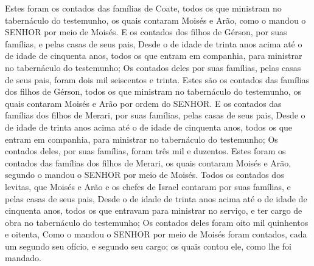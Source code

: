 {  Estes foram os contados das famílias de Coate, todos os que ministram no tabernáculo do testemunho, os quais contaram Moisés e Arão, como o mandou o SENHOR por meio de Moisés.
  E os contados dos filhos de Gérson, por suas famílias, e pelas casas de seus pais,
  Desde o de idade de trinta anos acima até o de idade de cinquenta anos, todos os que entram em companhia, para ministrar no tabernáculo do testemunho;
  Os contados deles por suas famílias, pelas casas de seus pais, foram dois mil seiscentos e trinta.
  Estes são os contados das famílias dos filhos de Gérson, todos os que ministram no tabernáculo do testemunho, os quais contaram Moisés e Arão por ordem do SENHOR.
  E os contados das famílias dos filhos de Merari, por suas famílias, pelas casas de seus pais,
  Desde o de idade de trinta anos acima até o de idade de cinquenta anos, todos os que entram em companhia, para ministrar no tabernáculo do testemunho;
  Os contados deles, por suas famílias, foram três mil e duzentos.
  Estes foram os contados das famílias dos filhos de Merari, os quais contaram Moisés e Arão, segundo o mandou o SENHOR por meio de Moisés.
  Todos os contados dos levitas, que Moisés e Arão e os chefes de Israel contaram por suas famílias, e pelas casas de seus pais,
  Desde o de idade de trinta anos acima até o de idade de cinquenta anos, todos os que entravam para ministrar no serviço, e ter cargo de obra no tabernáculo do testemunho;
  Os contados deles foram oito mil quinhentos e oitenta,
  Como o mandou o SENHOR por meio de Moisés foram contados, cada um segundo seu ofício, e segundo seu cargo; os quais contou ele, como lhe foi mandado.
\par }

